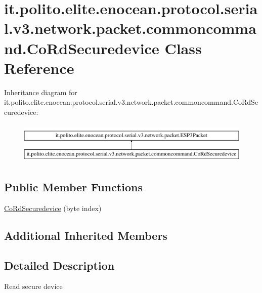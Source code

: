 \hypertarget{classit_1_1polito_1_1elite_1_1enocean_1_1protocol_1_1serial_1_1v3_1_1network_1_1packet_1_1commoncommand_1_1_co_rd_securedevice}{}\section{it.\+polito.\+elite.\+enocean.\+protocol.\+serial.\+v3.\+network.\+packet.\+commoncommand.\+Co\+Rd\+Securedevice Class Reference}
\label{classit_1_1polito_1_1elite_1_1enocean_1_1protocol_1_1serial_1_1v3_1_1network_1_1packet_1_1commoncommand_1_1_co_rd_securedevice}
Inheritance diagram for it.\+polito.\+elite.\+enocean.\+protocol.\+serial.\+v3.\+network.\+packet.\+commoncommand.\+Co\+Rd\+Securedevice\+:\begin{figure}[H]
\begin{center}
\leavevmode
\includegraphics[height=2.000000cm]{classit_1_1polito_1_1elite_1_1enocean_1_1protocol_1_1serial_1_1v3_1_1network_1_1packet_1_1commoncommand_1_1_co_rd_securedevice}
\end{center}
\end{figure}
\subsection*{Public Member Functions}
\begin{DoxyCompactItemize}
\item 
\hyperlink{classit_1_1polito_1_1elite_1_1enocean_1_1protocol_1_1serial_1_1v3_1_1network_1_1packet_1_1commoncommand_1_1_co_rd_securedevice_a659ac20e20444858ab35fcd0a0b15b77}{Co\+Rd\+Securedevice} (byte index)
\end{DoxyCompactItemize}
\subsection*{Additional Inherited Members}


\subsection{Detailed Description}
Read secure device

